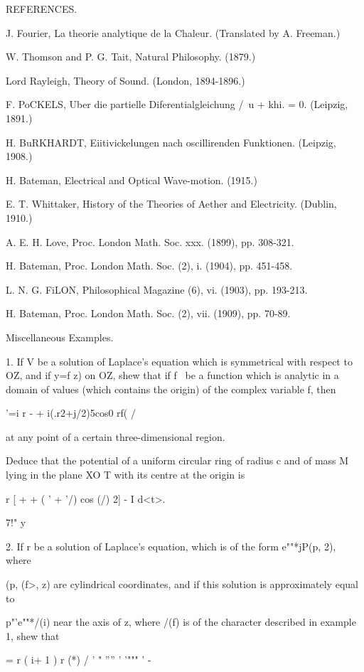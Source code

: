REFERENCES.

J. Fourier, La theorie analytique de la Chaleur. (Translated by A.
Freeman.)

W. Thomson and P. G. Tait, Natural Philosophy. (1879.)

Lord Rayleigh, Theory of Sound. (London, 1894-1896.)

F. PoCKELS, Uber die partielle Diferentialgleichung /\ u + khi. = 0.
(Leipzig, 1891.)

H. BuRKHARDT, Eiitivickelungen nach oscillirenden Funktionen.
(Leipzig, 1908.)

H. Bateman, Electrical and Optical Wave-motion. (1915.)

E. T. Whittaker, History of the Theories of Aether and Electricity.
(Dublin, 1910.)

A. E. H. Love, Proc. London Math. Soc. xxx. (1899), pp. 308-321.

H. Bateman, Proc. London Math. Soc. (2), i. (1904), pp. 451-458.

L. N. G. FiLON, Philosophical Magazine (6), vi. (1903), pp. 193-213.

H. Bateman, Proc. London Math. Soc. (2), vii. (1909), pp. 70-89.

Miscellaneous Examples.

1. If V be a solution of Laplace's equation which is symmetrical with
respect to OZ, and if y=f z) on OZ, shew that if f \ be a function
which is analytic in a domain of values (which contains the origin) of
the complex variable f, then

'=i r - + i(.r2+j/2)5cos0 rf( /

at any point of a certain three-dimensional region.

Deduce that the potential of a uniform circular ring of radius c and
of mass M lying in the plane XO T with its centre at the origin is

  r [ + + ( ' + '/) cos (/) 2] - I d<t>.

7!" y

%
%

2. If r be a solution of Laplace's equation, which is of the form
e""*jP(p, 2), where

(p, (f>, z) are cylindrical coordinates, and if this solution is
approximately equal to

p"'e""*/(i) near the axis of z, where /(f) is of the character
described in example 1, shew that

 = r ( i+ 1 ) r (*) / ' " '''' ' '""" ' - 

